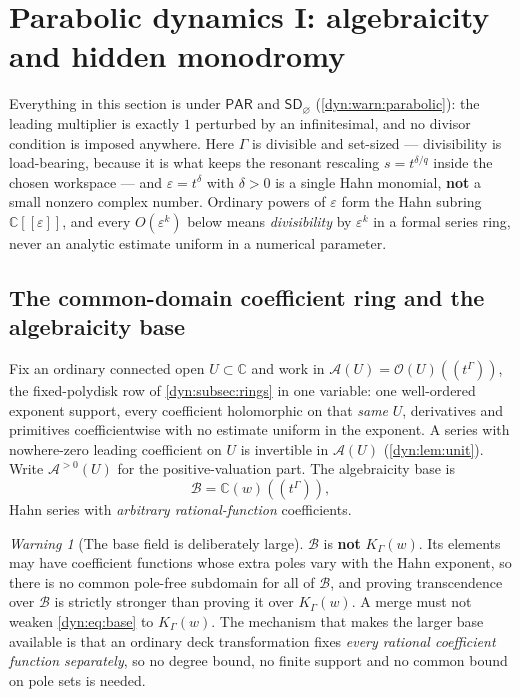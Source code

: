 \documentclass[11pt,letterpaper]{article}
\theoremstyle{definition}
\theoremstyle{remark}
\newtheorem{warning}[warning]{Warning}
\newcommand{\C}{\mathbb C}
\newcommand{\OO}{\mathcal O}
\newcommand{\AAA}{\mathscr A}
\newcommand{\BB}{\mathscr B}
\newcommand{\eps}{\varepsilon}
\newcommand{\sdno}{\mathsf{SD}_{\varnothing}}
\newcommand{\pares}{\mathsf{PAR}}
\numberwithin{equation}{section}
\begin{document}
\section{Parabolic dynamics I: algebraicity and hidden monodromy}
\label{dyn:sec:parabolic-monodromy}

Everything in this section is under $\pares$ and $\sdno$
(\cref{dyn:warn:parabolic}): the leading multiplier is exactly $1$
perturbed by an infinitesimal, and no divisor condition is imposed
anywhere. Here $\Gamma$ is divisible and set-sized --- divisibility is
load-bearing, because it is what keeps the resonant rescaling
$s=t^{\delta/q}$ inside the chosen workspace --- and $\eps=t^{\delta}$ with
$\delta>0$ is a single Hahn monomial, \textbf{not} a small nonzero complex
number. Ordinary powers of $\eps$ form the Hahn subring $\C[[\eps]]$, and
every $O(\eps^{k})$ below means \emph{divisibility} by $\eps^{k}$ in a
formal series ring, never an analytic estimate uniform in a numerical
parameter.

\subsection{The common-domain coefficient ring and the algebraicity base}
Fix an ordinary connected open $U\subset\C$ and work in
$\AAA(U)=\OO(U)((t^{\Gamma}))$, the fixed-polydisk row of
\cref{dyn:subsec:rings} in one variable: one well-ordered exponent support,
every coefficient holomorphic on that \emph{same} $U$, derivatives and
primitives coefficientwise with no estimate uniform in the exponent. A
series with nowhere-zero leading coefficient on $U$ is invertible in
$\AAA(U)$ (\cref{dyn:lem:unit}). Write $\AAA^{>0}(U)$ for the
positive-valuation part. The algebraicity base is
\begin{equation}\label{dyn:eq:base}
 \BB=\C(w)((t^{\Gamma})),
\end{equation}
Hahn series with \emph{arbitrary rational-function} coefficients.

\begin{warning}[The base field is deliberately large]\label{dyn:warn:base}
$\BB$ is \textbf{not} $K_\Gamma(w)$. Its elements may have coefficient
functions whose extra poles vary with the Hahn exponent, so there is no
common pole-free subdomain for all of $\BB$, and proving transcendence over
$\BB$ is strictly stronger than proving it over $K_\Gamma(w)$. A merge must
not weaken \eqref{dyn:eq:base} to $K_\Gamma(w)$. The mechanism that makes
the larger base available is that an ordinary deck transformation fixes
\emph{every rational coefficient function separately}, so no degree bound,
no finite support and no common bound on pole sets is needed.
\end{warning}
\end{document}
